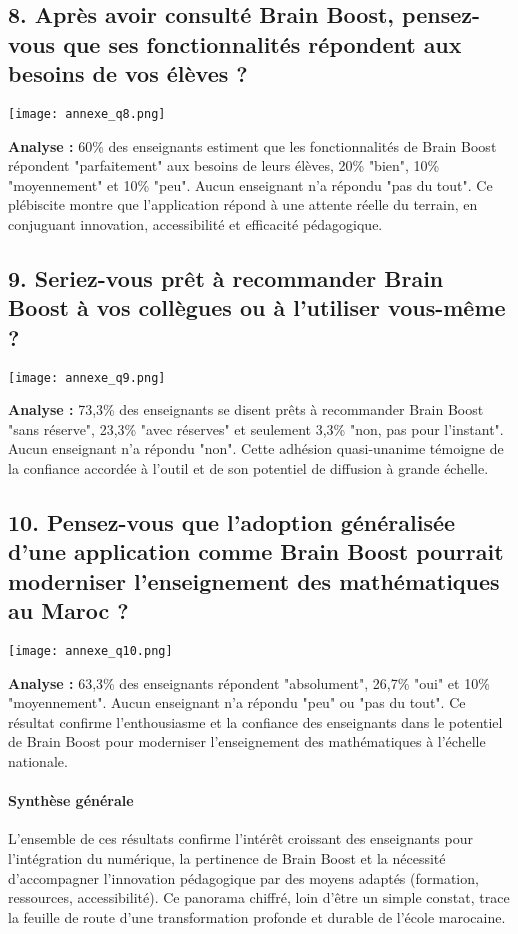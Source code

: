 \documentclass[a4paper,11pt]{report}
\begin{document}
\subsection*{8. Après avoir consulté Brain Boost, pensez-vous que ses fonctionnalités répondent aux besoins de vos élèves ?}
\begin{center}
    \texttt{[image: annexe\_q8.png]}
\end{center}
\textbf{Analyse :} 60\% des enseignants estiment que les fonctionnalités de Brain Boost répondent "parfaitement" aux besoins de leurs élèves, 20\% "bien", 10\% "moyennement" et 10\% "peu". Aucun enseignant n'a répondu "pas du tout". Ce plébiscite montre que l'application répond à une attente réelle du terrain, en conjuguant innovation, accessibilité et efficacité pédagogique.

\subsection*{9. Seriez-vous prêt à recommander Brain Boost à vos collègues ou à l'utiliser vous-même ?}
\begin{center}
    \texttt{[image: annexe\_q9.png]}
\end{center}
\textbf{Analyse :} 73,3\% des enseignants se disent prêts à recommander Brain Boost "sans réserve", 23,3\% "avec réserves" et seulement 3,3\% "non, pas pour l'instant". Aucun enseignant n'a répondu "non". Cette adhésion quasi-unanime témoigne de la confiance accordée à l'outil et de son potentiel de diffusion à grande échelle.

\subsection*{10. Pensez-vous que l'adoption généralisée d'une application comme Brain Boost pourrait moderniser l'enseignement des mathématiques au Maroc ?}
\begin{center}
    \texttt{[image: annexe\_q10.png]}
\end{center}
\textbf{Analyse :} 63,3\% des enseignants répondent "absolument", 26,7\% "oui" et 10\% "moyennement". Aucun enseignant n'a répondu "peu" ou "pas du tout". Ce résultat confirme l'enthousiasme et la confiance des enseignants dans le potentiel de Brain Boost pour moderniser l'enseignement des mathématiques à l'échelle nationale.

\paragraph{Synthèse générale} L'ensemble de ces résultats confirme l'intérêt croissant des enseignants pour l'intégration du numérique, la pertinence de Brain Boost et la nécessité d'accompagner l'innovation pédagogique par des moyens adaptés (formation, ressources, accessibilité). Ce panorama chiffré, loin d'être un simple constat, trace la feuille de route d'une transformation profonde et durable de l'école marocaine.
\end{document}
